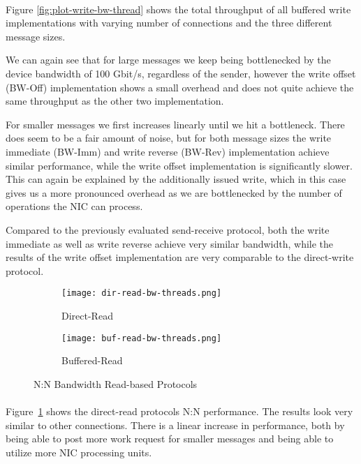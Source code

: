 \paragraph{} Figure \ref{fig:plot-write-bw-thread} shows the total throughput of all buffered write implementations
with varying number of connections and the three different message sizes.

We can again see that for large messages we keep being bottlenecked by the device bandwidth of 100 Gbit/s, regardless of 
the sender, however the write offset (BW-Off) implementation shows a small overhead and does not quite achieve the same 
throughput as the other two implementation. 

For smaller messages we  first increases linearly until we hit a bottleneck. There does seem to be a fair amount of noise,
but for both message sizes the write immediate (BW-Imm) and write reverse (BW-Rev) implementation achieve similar performance,
while the write offset implementation is significantly slower. This can again be explained by the additionally issued write, 
which in this case  gives us a more pronounced overhead as we are bottlenecked by the number of operations the NIC can process.


Compared to the previously evaluated send-receive protocol, both the write immediate as well as write reverse achieve very 
similar bandwidth, while the results of the write offset implementation are very comparable to the direct-write protocol.


\begin{figure}[ht]
  \begin{subfigure}[b]{0.49\textwidth}
  \centering
  \texttt{[image: dir-read-bw-threads.png]}
  \caption{Direct-Read}
  \label{fig:plot-dirread-bw-threads}
  \end{subfigure}
  \begin{subfigure}[b]{0.49\textwidth}
  \centering
  \texttt{[image: buf-read-bw-threads.png]}
  \caption{Buffered-Read}
  \label{fig:plot-bufread-bw-threads}
  \end{subfigure}
  \caption{N:N Bandwidth Read-based Protocols}
\end{figure}

\paragraph{}Figure~\ref{fig:plot-dirread-bw-threads} shows the direct-read protocols N:N performance. The results look very similar to 
other connections. There is a linear increase in performance, both by being able to post more work request for smaller 
messages and being able to utilize more NIC processing units.~\cite{anuj-guide}

